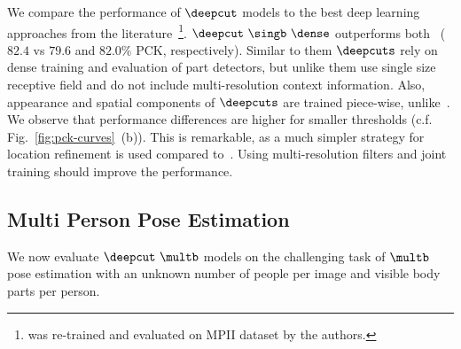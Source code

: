  We compare
the performance of $\deepcut$ models to the best deep learning
approaches from the
literature~\cite{tompson14nips,Tompson:2015:EOL}\footnote{\cite{tompson14nips}
  was re-trained and evaluated on MPII dataset by the
  authors.}.
$\deepcut~\singb~\dense$ outperforms
both~\cite{tompson14nips,Tompson:2015:EOL} ($82.4$ vs $79.6$ and $82.0$\%
PCK, respectively). Similar to them $\deepcuts$ rely on dense training
and evaluation of part detectors, but unlike them use single size
receptive field and do not include multi-resolution context
information. Also, appearance and spatial components of $\deepcuts$
are trained piece-wise, unlike~\cite{tompson14nips}. We observe that
performance differences are higher for smaller thresholds
(c.f. Fig.~\ref{fig:pck-curves}~(b)). This is remarkable, as a much
simpler strategy for location refinement is used compared
to~\cite{Tompson:2015:EOL}. Using multi-resolution filters and joint
training should improve the performance.



\subsection{Multi Person Pose Estimation}
We now evaluate $\deepcut~\multb$ models on the challenging task of
$\multb$ pose estimation with an unknown number of people per image
and visible body parts per person.

